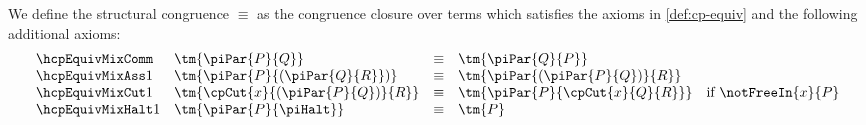 \begin{definition}\label{def:hcp-equiv}
  We define the structural congruence $\equiv$ as the congruence closure over
  terms which satisfies the axioms in \cref{def:cp-equiv} and the following
  additional axioms:
  \begin{gather*}
    \begin{array}{llcll}
      \hcpEquivMixComm
      & \tm{\piPar{P}{Q}}
      & \equiv
      & \tm{\piPar{Q}{P}}
      \\
      \hcpEquivMixAss1
      & \tm{\piPar{P}{( \piPar{Q}{R}} )}
      & \equiv
      & \tm{\piPar{( \piPar{P}{Q} )}{R}}
      \\
      \hcpEquivMixCut1
      & \tm{\cpCut{x}{( \piPar{P}{Q} )}{R}}
      & \equiv
      & \tm{\piPar{P}{\cpCut{x}{Q}{R}}}
      & \text{if }\notFreeIn{x}{P} 
      \\
      \hcpEquivMixHalt1
      & \tm{\piPar{P}{\piHalt}}
      & \equiv
      & \tm{P}
    \end{array}
  \end{gather*}
\end{definition}
